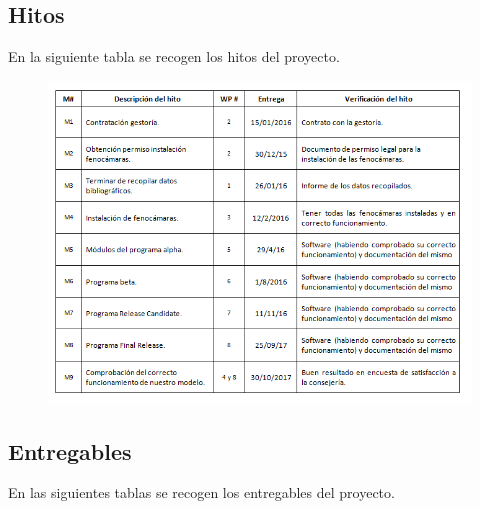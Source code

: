 \documentclass[12pt,oneside,a4paper]{article}
\numberwithin{figure}{section}
\begin{document}
\subsection{Hitos}

En la siguiente tabla se recogen los hitos del proyecto.

\begin{figure}[H]
\begin{center}
\includegraphics[scale=0.7]{hitos.png}
\end{center}
\end{figure}
\clearpage

\subsection{Entregables}

En las siguientes tablas se recogen los entregables del proyecto.
\end{document}

